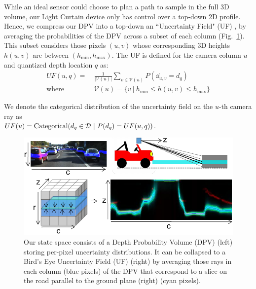 While an ideal sensor could choose to plan a path to sample in the full 3D volume, our Light Curtain device only has control over a top-down 2D profile. Hence, we compress our DPV into a top-down an ``Uncertainty Field" (UF) \cite{yang2019inferring}, by averaging the probabilities of the DPV across a subset of each column (Fig.~\ref{fig:uf}). This subset considers those pixels $(u, v)$ whose corresponding 3D heights $h(u, v)$ are between $(h_\text{min}, h_\text{max})$. The UF is defined for the camera column $u$ and quantized depth location $q$ as:
\begin{align}
   UF(u, q) =\ &\frac{1}{|\mathcal{V}(u)|}\sum_{v \in \mathcal{V}(u)} P(\dd_{u, v} = d_q)\nonumber\\
   \text{where } &\mathcal{V}(u) = \{v\ |\ h_\text{min} \leq h(u, v) \leq h_\text{max}\} 
   \label{eq:collapse}
\end{align}

We denote the categorical distribution of the uncertainty field on the $u$-th camera ray as \\$UF(u)=\text{Categorical}(d_q \in \D\ |\ P(d_q)= UF(u, q))$. 

\begin{figure}[h]
   \centering
   \begin{minipage}{0.5\textwidth}
       \centering
       \includegraphics[width=1.0\textwidth]{figures/bev.pdf}
   \end{minipage}\hfill
   \centering
   \caption{Our state space consists of a Depth Probability Volume (DPV) (left) storing per-pixel uncertainty distributions. It can be collapsed to a Bird's Eye Uncertainty Field (UF) (right) by averaging those rays in each column (blue pixels) of the DPV that correspond to a slice on the road parallel to the ground plane (right) (cyan pixels).}
   \label{fig:uf} 
\end{figure}

